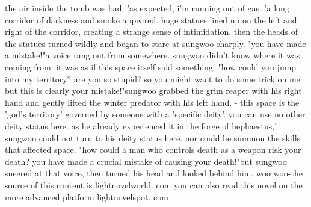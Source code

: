 the air inside the tomb was bad.
 'as expected, i'm running out of gas.
'a long corridor of darkness and smoke appeared.
 huge statues lined up on the left and right of the corridor, creating a strange sense of intimidation.
then the heads of the statues turned wildly and began to stare at sungwoo sharply.
"you have made a mistake!"a voice rang out from somewhere.
 sungwoo didn't know where it was coming from.
it was as if this space itself said something.
 "how could you jump into my territory? are you so stupid? so you might want to do some trick on me.
 but this is clearly your mistake!"sungwoo grabbed the grim reaper with his right hand and gently lifted the winter predator with his left hand.
- this space is the 'god's territory' governed by someone with a 'specific deity'.
 you can use no other deity status here.
as he already experienced it in the forge of hephaestus,' sungwoo could not turn to his deity status here.
 nor could he summon the skills that affected space.
"how could a man who controls death as a weapon risk your death? you have made a crucial mistake of causing your death!"but sungwoo sneered at that voice, then turned his head and looked behind him.
woo woo-the source of this content is lightnovelworld.
com you can also read this novel on the more advanced platform lightnovelspot.
com

 